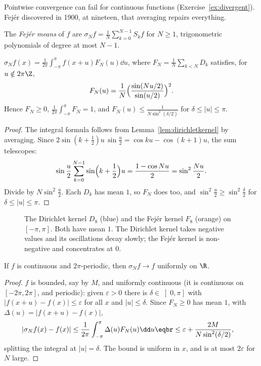 Pointwise convergence can fail for continuous functions (Exercise~\ref{ex:divergent}). Fej\'er discovered in 1900, at
nineteen, that averaging repairs everything.

\begin{definition}
The \emph{Fej\'er means} of $f$ are $\sigma_Nf=\frac1N\sum_{k=0}^{N-1}S_kf$ for $N\ge1$, trigonometric polynomials of degree at most $N-1$.
\end{definition}

\begin{lemma}\label{lem:fejerkernel}
$\sigma_Nf(x)=\frac1{2\pi}\int_{-\pi}^\pi f(x+u)F_N(u)\dd u$, where $F_N=\frac1N\sum_{k<N}D_k$ satisfies, for $u\notin2\pi\Z$,
\[
F_N(u)=\frac1N\Bigl(\frac{\sin(Nu/2)}{\sin(u/2)}\Bigr)^2.
\]
Hence $F_N\ge0$, $\frac1{2\pi}\int_{-\pi}^\pi F_N=1$, and $F_N(u)\le\frac1{N\sin^2(\delta/2)}$ for $\delta\le|u|\le\pi$.
\end{lemma}
\begin{proof}
The integral formula follows from Lemma~\ref{lem:dirichletkernel} by averaging. Since
$2\sin(k+\frac12)u\,\sin\frac u2=\cos ku-\cos(k+1)u$, the sum telescopes:
\[
\sin\frac u2\sum_{k=0}^{N-1}\sin\Bigl(k+\frac12\Bigr)u=\frac{1-\cos Nu}2=\sin^2\frac{Nu}2.
\]
Divide by $N\sin^2\frac u2$. Each $D_k$ has mean $1$, so $F_N$ does too, and $\sin^2\frac u2\ge\sin^2\frac\delta2$ for $\delta\le|u|\le\pi$.
\end{proof}

\begin{figure}[ht]
\centering
{}
\caption{The Dirichlet kernel $D_8$ (blue) and the Fej\'er kernel $F_8$ (orange) on $[-\pi,\pi]$. Both have mean $1$. The Dirichlet kernel
takes negative values and its oscillations decay slowly; the Fej\'er kernel is non-negative and concentrates at $0$.}
\label{fig:kernels}
\end{figure}

\begin{theorem}[Fej\'er, 1900]\label{thm:fejer}
If $f$ is continuous and $2\pi$-periodic, then $\sigma_Nf\to f$ uniformly on $\R$.
\end{theorem}
\begin{proof}
$f$ is bounded, say by $M$, and uniformly continuous (it is continuous on $[-2\pi,2\pi]$, and periodic): given $\varepsilon>0$ there is
$\delta\in\left]0,\pi\right]$ with $|f(x+u)-f(x)|\le\varepsilon$ for all $x$ and $|u|\le\delta$. Since $F_N\ge0$ has mean $1$, with $\Delta(u)=|f(x+u)-f(x)|$,
\[
\begin{aligned}|\sigma_Nf(x)-f(x)|&\le\frac1{2\pi}\int_{-\pi}^\pi\Delta(u)F_N(u)\dd u\eqbr\le\varepsilon+\frac{2M}{N\sin^2(\delta/2)},\end{aligned}
\]
splitting the integral at $|u|=\delta$. The bound is uniform in $x$, and is at most $2\varepsilon$ for $N$ large.
\end{proof}

